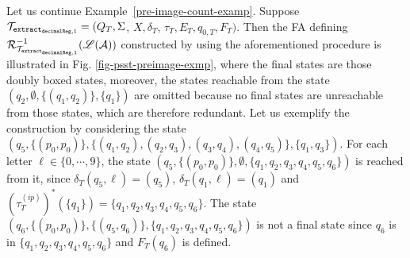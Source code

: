 
\begin{example}
Let us continue Example~\ref{pre-image-count-examp}. Suppose $\mathcal{T}_{\tt extract_{decimalReg,1}} = (Q_T, \Sigma$, $X, \delta_T$, $\tau_T, E_T,  q_{0, T}, F_T)$. Then the FA defining $\mathcal{R}^{-1}_{\mathcal{T}_{\tt extract_{decimalReg,1}}}(\mathscr{L}(\mathcal{A}))$ constructed by using the aforementioned procedure is illustrated in Fig. \ref{fig-psst-preimage-exmp}, where the final states are those doubly boxed states, moreover, the states reachable from the state $(q_2, \emptyset, \{(q_1,q_2)\}, \{q_1\})$ are omitted because no final states are unreachable from those states, which are therefore redundant. Let us exemplify the construction by considering the state $(q_5, \{(p_0,p_0)\}, \{(q_1,q_2), (q_2,q_3), (q_3,q_4), (q_4, q_5)\}, \{q_1,q_3\})$. For each letter $\ell \in \{0,\cdots, 9\}$, the state $(q_5, \{(p_0,p_0)\}, \emptyset, \{q_1,q_2, q_3, q_4, q_5, q_6\})$ is reached from it, since $\delta_T(q_5,\ell)  = (q_5)$, $\delta_T(q_1,\ell) = (q_1)$ and $(\tau^{(ip)}_T)^*(\{q_1\}) = \{q_1, q_2, q_3, q_4, q_5, q_6\}$. The state $(q_6, \{(p_0,p_0)\}, \{(q_5,q_6)\}, \{q_1, q_2, q_3, q_4, q_5, q_6\})$ is not a final state since $q_6$ is in $\{q_1, q_2, q_3, q_4, q_5, q_6\}$ and $F_T(q_6)$ is defined.
%
\begin{figure}[ht]
\centering


\end{figure}
\end{example}
